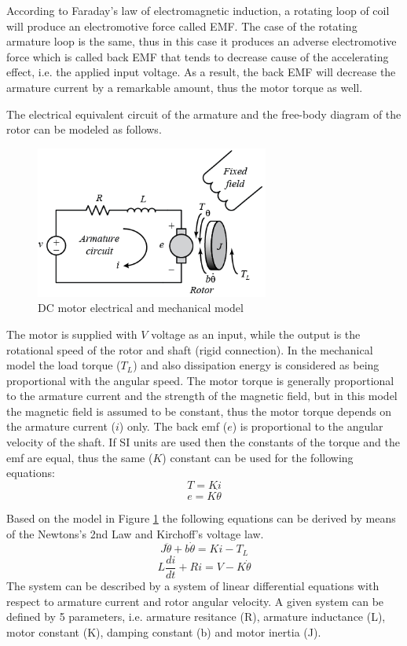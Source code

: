 \documentclass[12pt,english]{article}
\begin{document}
According to Faraday's law of electromagnetic induction, a rotating loop of coil will produce an electromotive force called EMF. The case of the rotating armature loop is the same, thus in this case it produces an adverse electromotive force which is called back EMF that tends to decrease cause of the accelerating effect, i.e. the applied input voltage. As a result, the back EMF will decrease the armature current by a remarkable amount, thus the motor torque as well. \cite{dc_motor_1} \cite{dc_motor_2}

The electrical equivalent circuit of the armature and the free-body diagram of the rotor can be modeled as follows.
\begin{figure}[htb!]
	\centering
	\includegraphics[height=5cm]{figures/dc_motor_model.png}
	\caption{DC motor electrical and mechanical model \cite{dc_motor_3}}
	\label{dc_motor_model}
\end{figure}

The motor is supplied with $V$ voltage as an input, while the output is the rotational speed of the rotor and shaft (rigid connection). In the mechanical model the load torque ($T_L$) and also dissipation energy is considered as being proportional with the angular speed. The motor torque is generally proportional to the armature current and the strength of the magnetic field, but in this model the magnetic field is assumed to be constant, thus the motor torque depends on the armature current ($i$) only. The back emf ($e$) is proportional to the angular velocity of the shaft. If SI units are used then the constants of the torque and the emf are equal, thus the same ($K$) constant can be used for the following equations:\cite{dc_motor_3}\cite{dc_motor_4}
\begin{equation}
T = K i
\end{equation}
\begin{equation}
e = K \dot \theta
\end{equation}		

Based on the model in Figure \ref{dc_motor_model} the following equations can be derived by means of the Newtons's 2nd Law and Kirchoff's voltage law.
\begin{equation}
J \ddot \theta + b \dot \theta = K i - T_L
\label{dc_eq_1}
\end{equation}
\begin{equation}
L \frac{di}{dt} + R i = V - K \dot \theta
\label{dc_eq_2}
\end{equation}
The system can be described by a system of linear differential equations with respect to armature current and rotor angular velocity. A given system can be defined by 5 parameters, i.e. armature resitance (R), armature inductance (L), motor constant (K), damping constant (b) and motor inertia (J).
\end{document}
